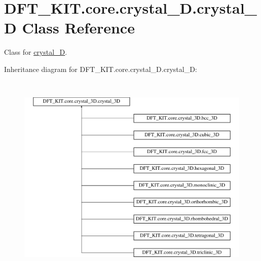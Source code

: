 \hypertarget{class_d_f_t___k_i_t_1_1core_1_1crystal__3_d_1_1crystal__3_d}{\section{D\+F\+T\+\_\+\+K\+I\+T.\+core.\+crystal\+\_\+D.\+crystal\+\_\+D Class Reference}
\label{class_d_f_t___k_i_t_1_1core_1_1crystal__3_d_1_1crystal__3_d}
}


Class for \hyperlink{class_d_f_t___k_i_t_1_1core_1_1crystal__3_d_1_1crystal__3_d}{crystal\+\_\+D}.  


Inheritance diagram for D\+F\+T\+\_\+\+K\+I\+T.\+core.\+crystal\+\_\+D.\+crystal\+\_\+D\+:\begin{figure}[H]
\begin{center}
\leavevmode
\includegraphics[height=10.000000cm]{class_d_f_t___k_i_t_1_1core_1_1crystal__3_d_1_1crystal__3_d}
\end{center}
\end{figure}
